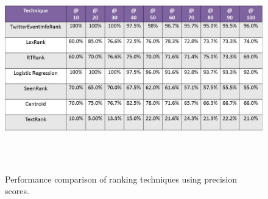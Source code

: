 \begin{figure}[htbp]
\centering
\includegraphics[height=3.5in,width=5.5in]{Figures/sydneysiegeprecision.jpg}
\caption{\small Performance comparison of ranking techniques using precision scores.}
\label{sydneysiegeprecision}
\end{figure}


